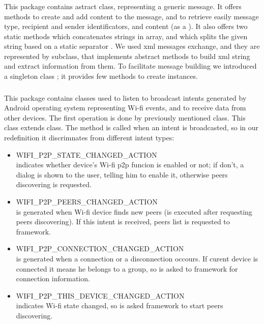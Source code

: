 	\subsubsection{}
	This package contains  astract class, representing a generic message. It offers methods to create and add content to the message, and to retrieve easily message type, recipient and sender identificators, and content (as a ). It also offers two static methods  which concatenates strings in  array, and  which splits the given string based on a static separator . 
	We used xml messages exchange, and they are represented by  subclass, that implements  abstract methods to build xml string and extract information from them. To facilitate message building we introduced a singleton class ; it provides few methods to create  instances.
	\hfill\\
	\subsubsection{}
	This package contains classes used to listen to broadcast intents generated by Android operating system representing Wi-fi events, and to receive data from other devices.
	The first operation is done by previously mentioned  class. This class extends  class. The method  is called when an intent is broadcasted, so in our redefinition it discrimnates from different intent types:
	\begin{itemize}
		\item WIFI\_P2P\_STATE\_CHANGED\_ACTION \hfill \\
		indicates whether device's Wi-fi p2p funcion is enabled or not; if don't, a dialog is shown to the user, telling him to enable it, otherwise peers discovering is requested.
		\item WIFI\_P2P\_PEERS\_CHANGED\_ACTION \hfill \\
		is generated when Wi-fi device finds new peers (is executed after requesting peers discovering). If this intent is received, peers list is requested to \direct framework.
		\item WIFI\_P2P\_CONNECTION\_CHANGED\_ACTION \hfill \\
		is generated when a connection or a disconnection occours. If curent device is connected it means he belongs to a \direct group, so is asked to \direct framework for connection information.
		\item WIFI\_P2P\_THIS\_DEVICE\_CHANGED\_ACTION \hfill \\
		indicates Wi-fi state changed, so is asked \direct framework to start peers discovering.		
	\end{itemize}

